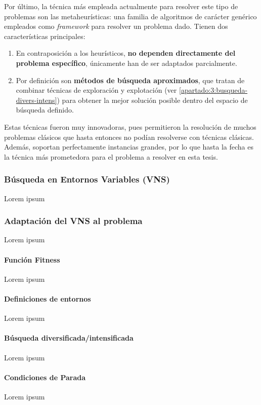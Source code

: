 Por último, la técnica más empleada actualmente para resolver este tipo de problemas son las metaheurísticas: una familia de algoritmos de carácter genérico empleados como \textit{framework} para resolver un problema dado. Tienen dos características principales: \cite{sota:metaheuristicas}

\begin{enumerate}
	\item En contraposición a los heurísticos, \textbf{no dependen directamente del problema específico}, únicamente han de ser adaptados parcialmente.
	\item Por definición son \textbf{métodos de búsqueda aproximados}, que tratan de combinar técnicas de exploración y explotación (ver \autoref{apartado:3:busqueda-divers-intens}) para obtener la mejor solución posible dentro del espacio de búsqueda definido.
\end{enumerate}

Estas técnicas fueron muy innovadoras, pues permitieron la resolución de muchos problemas clásicos que hasta entonces no podían resolverse con técnicas clásicas. Además, soportan perfectamente instancias grandes, por lo que hasta la fecha es la técnica más prometedora para el problema a resolver en esta tesis.






\subsubsection{Búsqueda en Entornos Variables (VNS)}
Lorem ipsum
\subsubsection{Adaptación del VNS al problema}
Lorem ipsum
\paragraph{Función Fitness} 
Lorem ipsum

\paragraph{Definiciones de entornos}
Lorem ipsum

\paragraph{Búsqueda diversificada/intensificada} \label{apartado:3:busqueda-divers-intens}
Lorem ipsum

\paragraph{Condiciones de Parada}
Lorem ipsum










